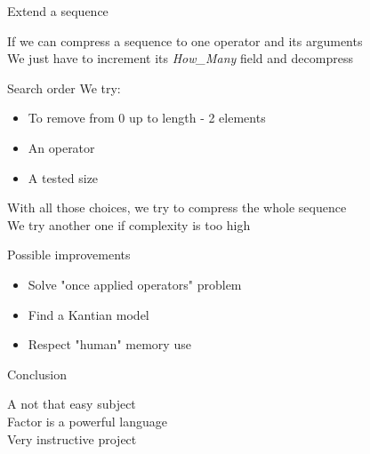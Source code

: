 \documentclass{beamer}
\begin{document}
\begin{frame}{Extend a sequence}
  \begin{center}
    If we can compress a sequence to one operator and its arguments\\
    We just have to increment its \textit{How\_Many} field and decompress
  \end{center}
\end{frame}

\begin{frame}{Search order}
  We try:
  \begin{itemize}
    \item{To remove from 0 up to length - 2 elements}
    \item{An  operator}
    \item{A tested size}
  \end{itemize}
  With all those choices, we try to compress the whole sequence\\
  We try another one if complexity is too high
\end{frame}

\begin{frame}{Possible improvements}
  \begin{center}
    \begin{itemize}
    \item{Solve "once applied operators" problem}
    \item{Find a Kantian model}
    \item{Respect "human" memory use}
  \end{itemize}
   
  \end{center}
\end{frame}

\begin{frame}{Conclusion}
  \begin{center}
  A not that easy subject\\
  Factor is a powerful language\\
  Very instructive project
  \end{center}
\end{frame}
 
\end{document}
